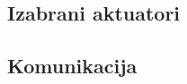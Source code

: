 \documentclass[times, utf8, diplomski, numeric]{templates/template}
\begin{document}
{{        \subsection{Izabrani aktuatori}{
        }

        \subsection{Komunikacija}{
        }
    }
}
\end{document}
